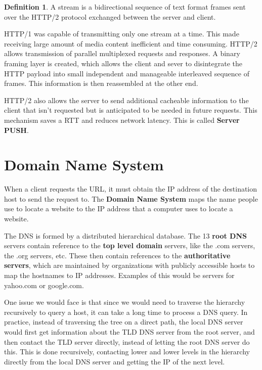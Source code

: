 \documentclass[12pt,letterpaper]{amsbook}
\theoremstyle{definition}
\newtheorem{definition}{Definition}[section] %
\begin{document}
\begin{definition}
  A stream is a bidirectional sequence of text format frames sent over the HTTP/2 protocol exchanged between the server and client.  
\end{definition}

HTTP/1 was capable of transmitting only one stream at a time. This made receiving large amount of media content inefficient and time consuming. HTTP/2 allows transmission of parallel multiplexed requests and responses. A binary framing layer is created, which allows the client and sever to disintegrate the HTTP payload into small independent and manageable interleaved sequence of frames. This information is then reassembled at the other end.

HTTP/2 also allows the server to send additional cacheable information to the client that isn't requested but is anticipated to be needed in future requests. This mechanism saves a RTT and reduces network latency. This is called \textbf{Server PUSH}.

\section{Domain Name System}

When a client requests the URL, it must obtain the IP address of the destination host to send the request to. The \textbf{Domain Name System} maps the name people use to locate a website to the IP address that a computer uses to locate a website.

The DNS is formed by a distributed hierarchical database. The 13 \textbf{root DNS} servers contain reference to the \textbf{top level domain} servers, like the .com servers, the .org servers, etc. These then contain references to the \textbf{authoritative servers}, which are maintained by organizations with publicly accessible hosts to map the hostnames to IP addresses. Examples of this would be servers for yahoo.com or google.com.

One issue we would face is that since we would need to traverse the hierarchy recursively to query a host, it can take a long time to process a DNS query. In practice, instead of traversing the tree on a direct path, the local DNS server would first get information about the TLD DNS server from the root server, and then contact the TLD server directly, instead of letting the root DNS server do this. This is done recursively, contacting lower and lower levels in the hierarchy directly from the local DNS server and getting the IP of the next level.
\end{document}
